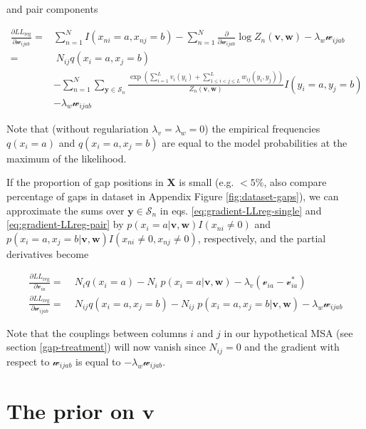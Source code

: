 \documentclass[12pt,a4paper,twoside]{book}
\newcommand{\eq}{\!=\!}
\newcommand{\LLreg}{L\!L_\mathrm{reg}}
\newcommand{\Sn}{\mathcal{S}_n}
\renewcommand{\v}{\mathbf{v}}
\newcommand{\via}{\mathcal{v}_{ia}}
\newcommand{\w}{\mathbf{w}}
\newcommand{\wijab}{\mathcal{w}_{ijab}}
\newcommand{\X}{\mathbf{X}}
\theoremstyle{definition}
\theoremstyle{definition}
\theoremstyle{remark}
\begin{document}
and pair components

\begin{align}
    \frac{\partial \LLreg}{\partial \wijab} =& \sum_{n=1}^N I(x_{ni} \eq a, x_{nj} \eq b) - \sum_{n=1}^N \frac{\partial}{\partial \wijab} \log Z_n(\v,\w)  - \lambda_w \wijab \\
                                            =& \; N_{ij} q(x_i \eq a, x_j=b) \\
                                            & - \sum_{n=1}^N \sum_{\mathbf{y} \in \Sn} \frac{ \exp \left( \sum_{i=1}^L v_i(y_i) + \sum_{1 \le i<j \le L}^L w_{ij}(y_i,y_j) \right) }{Z_n(\v,\w)} I(y_i \eq a, y_j \eq b) \\
                                            & - \lambda_w \wijab  
\label{eq:gradient-LLreg-pair}
\end{align}

Note that (without regulariation \(\lambda_v = \lambda_w = 0\)) the
empirical frequencies \(q(x_i \eq a)\) and \(q(x_i \eq a, x_j=b)\) are
equal to the model probabilities at the maximum of the likelihood.

If the proportion of gap positions in \(\X\) is small (e.g. \(<5\%\),
also compare percentage of gaps in dataset in Appendix Figure
\ref{fig:dataset-gaps}), we can approximate the sums over
\(\mathbf{y} \in \Sn\) in eqs. \eqref{eq:gradient-LLreg-single} and
\eqref{eq:gradient-LLreg-pair} by \(p(x_i=a | \v,\w) I(x_{ni} \ne 0)\) and
\(p(x_i=a, x_j=b | \v,\w) I(x_{ni} \ne 0, x_{nj} \ne 0)\), respectively,
and the partial derivatives become

\begin{align}
  \frac{\partial \LLreg}{\partial \via}   =& \; N_i q(x_i \eq a) -  N_i \; p(x_i \eq a  | \v,\w)  - \lambda_v (\via - \via^*)  \\
  \frac{\partial \LLreg}{\partial \wijab} =& \; N_{ij} q(x_i \eq a, x_j=b) - N_{ij} \; p(x_i \eq a, x_j \eq b | \v,\w) - \lambda_w \wijab
  \label{eq:gradient-LLreg-approx}
\end{align}

Note that the couplings between columns \(i\) and \(j\) in our
hypothetical MSA (see section \ref{gap-treatment}) will now vanish since
\(N_{ij} \eq 0\) and the gradient with respect to \(\wijab\) is equal to
\(-\lambda_w \wijab\).

\section{\texorpdfstring{The prior on
\(\v\)}{The prior on \textbackslash{}v}}\label{prior-v}
\end{document}
